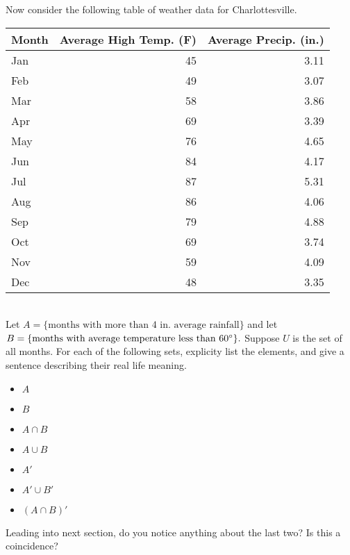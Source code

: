 \documentclass[14,fleqn]{article}
\begin{document}
Now consider the following table of weather data for Charlottesville.\\
\begin{tabular}{l|r|r}
	Month&Average High Temp. (\degree F)&Average Precip. (in.)\\\hline
Jan&45&3.11\\\hline
Feb&49&3.07\\\hline
Mar&58&3.86\\\hline
Apr&69&3.39\\\hline
May&76&4.65\\\hline
Jun&84&4.17\\\hline
Jul&87&5.31\\\hline
Aug&86&4.06\\\hline
Sep&79&4.88\\\hline
Oct&69&3.74\\\hline
Nov&59&4.09\\\hline
Dec&48&3.35\\\hline
\end{tabular}\\
Let $A=\{\text{months with more than 4 in. average rainfall}\}$ and let $B=\{\text{months with average temperature less than 60\degree}\}.$ Suppose $U$ is the set of all months. For each of the following sets, explicity list the elements, and give a sentence describing their real life meaning.
\begin{itemize}
	\item $A$
	\item $B$
	\item $A\cap B$
	\item $A\cup B$
	\item $A'$
	\item $A'\cup B'$
	\item $(A\cap B)'$
\end{itemize}
Leading into next section, do you notice anything about the last two? Is this a coincidence?
\end{document}

